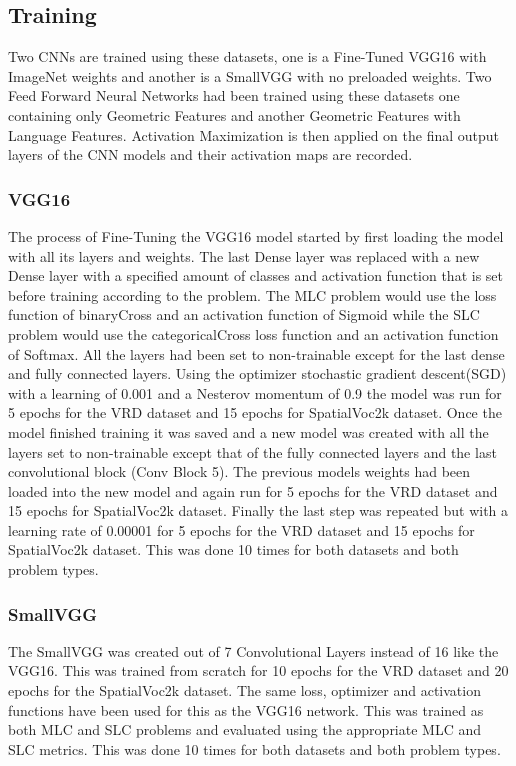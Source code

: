 \documentclass{csfyp}
\begin{document}
\subsection{Training}
Two CNNs are trained using these datasets, one is a Fine-Tuned VGG16 with ImageNet weights and another is a SmallVGG with no preloaded weights. Two Feed Forward Neural Networks had been trained using these datasets one containing only Geometric Features and another Geometric Features with Language Features. Activation Maximization is then applied on the final output layers of the CNN models and their activation maps are recorded.

\subsubsection{VGG16}
The process of Fine-Tuning the VGG16 model started by first loading the model with all its layers and weights. The last Dense layer was replaced with a new Dense layer with a specified amount of classes and activation function that is set before training according to the problem. The MLC problem would use the \Gls{loss} function of \Gls{binaryCross} and an activation function of Sigmoid while the SLC problem would use the \Gls{categoricalCross} \Gls{loss} function and an activation function of Softmax. All the layers had been set to non-trainable except for the last dense and fully connected layers. Using the optimizer stochastic gradient descent(SGD) with a learning of 0.001 and a Nesterov momentum of 0.9 the model was run for 5 \Gls{epoch}s for the VRD dataset and 15 \Gls{epoch}s for SpatialVoc2k dataset. Once the model finished training it was saved and a new model was created with all the layers set to non-trainable except that of the fully connected layers and the last convolutional block (Conv Block 5). The previous models weights had been loaded into the new model and again run for 5 \Gls{epoch}s for the VRD dataset and 15 \Gls{epoch}s for SpatialVoc2k dataset. Finally the last step was repeated but with a learning rate of 0.00001 for 5 \Gls{epoch}s for the VRD dataset and 15 \Gls{epoch}s for SpatialVoc2k dataset. This was done 10 times for both datasets and both problem types.

\subsubsection{SmallVGG}
The SmallVGG was created out of 7 Convolutional Layers instead of 16 like the VGG16. This was trained from scratch for 10 \Gls{epoch}s for the VRD dataset and 20 \Gls{epoch}s for the SpatialVoc2k dataset. The same \Gls{loss}, optimizer and activation functions have been used for this as the VGG16 network. This was trained as both MLC and SLC problems and evaluated using the appropriate MLC and SLC metrics. This was done 10 times for both datasets and both problem types.
\end{document}
